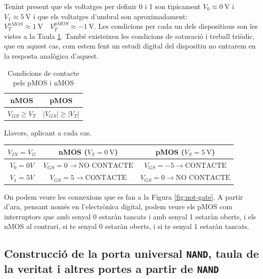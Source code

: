 \documentclass[11pt,a4paper]{article}
\begin{document}
Tenint present que els voltatges per definir 0 i 1 son tipicament $V_0 \approx \qty{0}{\volt}$ i $V_1 \approx \qty{5}{\volt}$ i que els voltatges d'umbral son aproximadament: $V_T^{nMOS} \approx \qty{1}{\volt} \quad V_T^{pMOS} \approx \qty{-1}{\volt}$.
\newpage
Les condicions per cada un dels dispositious son les vistes a la Taula \ref{tab:saturation-cond}. També existeixen les condicions de saturació i treball triòdic, que en aquest cas, com estem fent un estudi digital del dispositiu no entrarem en la resposta analògica d'aquest. 

\begin{table}[]
    \centering
    \begin{tabular}{c|c}
        \textbf{nMOS} & \textbf{pMOS} \\
        \hline
        $V_{GS} \ge V_{T}$ & $ \left|V_{GS}\right| \ge \left|V_{T}\right|$
    \end{tabular}
    \caption{Condicions de contacte pels pMOS i nMOS}
    \label{tab:saturation-cond}
\end{table}

Llavors, aplicant a cada cas.

\begin{table}[h]
    \centering
    \begin{tabular}{c|c|c}
        $V_{IN} = V_G$ & \textbf{nMOS} ($V_S = \qty{0}{\volt}$) & \textbf{pMOS} ($V_S = \qty{5}{\volt}$) \\
        \hline
        $V_0 = 0V$ & $V_{GS} = 0 \rightarrow \text{NO CONTACTE} $ & $V_{GS} = -5 \rightarrow \text{CONTACTE}$\\
        $V_1 = 5V$ & $V_{GS} = 5 \rightarrow \text{CONTACTE} $ & $V_{GS} = 0 \rightarrow \text{NO CONTACTE}$
    \end{tabular}
    \label{<label>}
\end{table}

On podem veure les connexions que es fan a la Figura \ref{fig:not-gate}. A partir d'ara, pensant només en l'electrònica digital, podem veure els pMOS com interruptors que amb senyal 0 estaràn tancats i amb senyal 1 estaràn oberts, i els nMOS al contrari, si te senyal 0 estaràn oberts, i si te senyal 1 estaràn tancats.

\subsection{Construcció de la porta universal \texttt{NAND}, taula de la veritat i altres portes a partir de \texttt{NAND} }
\end{document}
